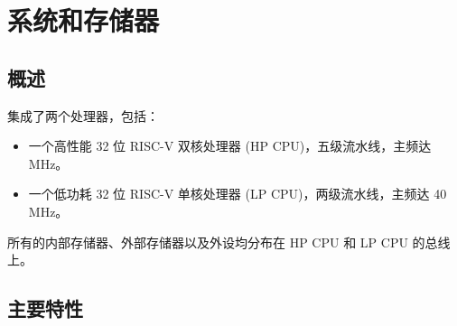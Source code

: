 \documentclass[main\_\_CN.tex]{subfiles}
\begin{document}

\ifglobal
\else
    {\let\clearpage\relax \listoftodos}
    {\let\clearpage\relax \listofdonetodos}
    \tableofcontents
\fi
\hypertarget{sysmem}{}
\chapter{系统和存储器}
\label{mod:sysmem}

\section{概述}

\chipname{} 集成了两个处理器，包括：
\begin{itemize}
    \item 一个高性能 32 位 RISC-V 双核处理器 (HP CPU)，五级流水线，主频达  MHz。
    \item 一个低功耗 32 位 RISC-V 单核处理器 (LP CPU)，两级流水线，主频达 40 MHz。
\end{itemize}

所有的内部存储器、外部存储器以及外设均分布在 HP CPU 和 LP CPU 的总线上。

\section{主要特性}
\end{document}
